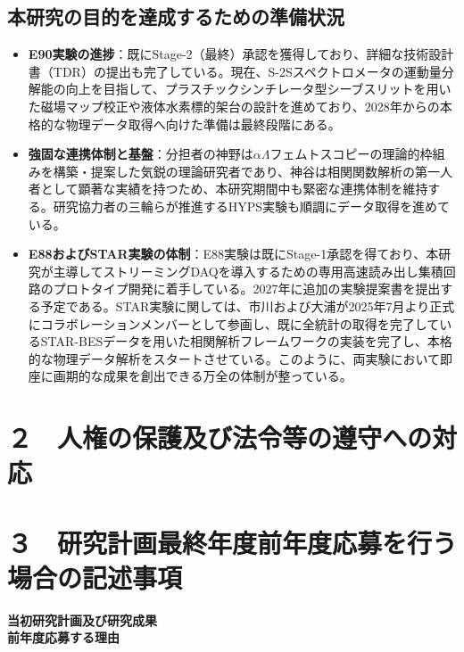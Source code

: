 \documentclass[11pt,a4j,dvipdfmx]{jarticle} 					%
\newcommand{\研究課題名}{加速器実験による短距離バリオン間相互作用の解明と中性子星ハイペロンパズルの解決}
\newcommand{\研究機関名}{東北大学}
\newcommand{\研究代表者氏名}{市川裕大}
\newcommand{\研究期間の最終元号年度}{13}
\begin{document}
\subsection{本研究の目的を達成するための準備状況}

\begin{itemize}
    \item \textbf{E90実験の進捗}：既にStage-2（最終）承認を獲得しており、詳細な技術設計書（TDR）の提出も完了している。現在、S-2Sスペクトロメータの運動量分解能の向上を目指して、プラスチックシンチレータ型シーブスリットを用いた磁場マップ校正や液体水素標的架台の設計を進めており、2028年からの本格的な物理データ取得へ向けた準備は最終段階にある。
    \item \textbf{強固な連携体制と基盤}：分担者の神野は$\alpha\Lambda$フェムトスコピーの理論的枠組みを構築・提案した気鋭の理論研究者であり、神谷は相関関数解析の第一人者として顕著な実績を持つため、本研究期間中も緊密な連携体制を維持する。研究協力者の三輪らが推進するHYPS実験も順調にデータ取得を進めている。
    \item \textbf{E88およびSTAR実験の体制}：E88実験は既にStage-1承認を得ており、本研究が主導してストリーミングDAQを導入するための専用高速読み出し集積回路のプロトタイプ開発に着手している。2027年に追加の実験提案書を提出する予定である。STAR実験に関しては、市川および大浦が2025年7月より正式にコラボレーションメンバーとして参画し、既に全統計の取得を完了しているSTAR-BESデータを用いた相関解析フレームワークの実装を完了し、本格的な物理データ解析をスタートさせている。このように、両実験において即座に画期的な成果を創出できる万全の体制が整っている。
\end{itemize}





\section{２　人権の保護及び法令等の遵守への対応}



\section{３　研究計画最終年度前年度応募を行う場合の記述事項}
\newcommand{\最終年度研究種目名}{}
\newcommand{\最終年度研究課題番号}{}
\newcommand{\最終年度研究課題名}{}
\newcommand{\最終年度研究期間}{}


\noindent
\textbf{当初研究計画及び研究成果}\\
\noindent
\textbf{前年度応募する理由}\\




\end{document}
